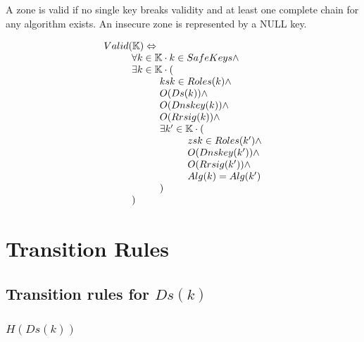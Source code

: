 \documentclass[twoside,english]{paper}
\begin{document}
A zone is valid if no single key breaks validity and at least one complete
chain for any algorithm exists. An insecure zone is represented by a NULL
key.

\begin{displaymath}
\begin{array}{l}
Valid(\mathbb{K}) \Leftrightarrow \\
\hskip 1cm	\forall k \in \mathbb{K} \cdot k \in SafeKeys \wedge \\
\hskip 1cm	\exists k \in \mathbb{K} \cdot ( \\
\hskip 2cm		ksk \in Roles(k) \wedge \\
\hskip 2cm		O(Ds(k)) \wedge \\
\hskip 2cm		O(Dnskey(k)) \wedge \\
\hskip 2cm		O(Rrsig(k)) \wedge \\
\hskip 2cm		\exists k' \in \mathbb{K} \cdot ( \\
\hskip 3cm			zsk \in Roles(k') \wedge \\
\hskip 3cm			O(Dnskey(k')) \wedge \\
\hskip 3cm			O(Rrsig(k')) \wedge \\
\hskip 3cm			Alg(k)=Alg(k')\\
\hskip 2cm		)\\
\hskip 1cm	)
\end{array}
\end{displaymath}

\section{Transition Rules}
\subsection{Transition rules for $Ds(k)$}

\subsubsection*{$H(Ds(k))$}
\end{document}
